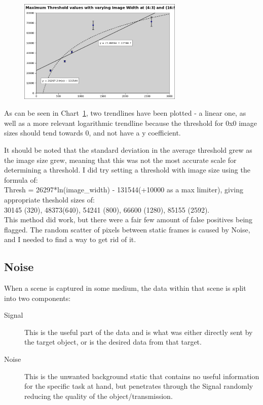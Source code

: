 {{\begin{figure}
	\vspace{-20pt}
	\begin{center}
		\includegraphics[width=0.7\textwidth]{../images/chart-threshold-with-varying-image}
	\end{center}
	\vspace{-15pt}
	\caption{}
	\label{chart:thresholds}
	\vspace{-10pt}
\end{figure}

As can be seen in Chart~\cref{chart:thresholds}, two trendlines have been plotted - a linear one, as well as a more relevant logarithmic trendline because the threshold for 0x0 image sizes should tend towards 0, and not have a y coefficient.

It should be noted that the standard deviation in the average threshold grew as the image size grew, meaning that this was not the most accurate scale for determining a threshold. I did try setting a threshold with image size using the formula of:\\
Thresh = 26297*ln(image\_width) - 131544(+10000 as a max limiter),  giving appropriate theshold sizes of:\\
30145 (320), 48373(640), 54241 (800), 66600 (1280), 85155 (2592).\\
This method did work, but there were a fair few amount of false positives being flagged.
The random scatter of pixels between static frames is caused by Noise, and I needed to find a way to get rid of it.

\subsection{Noise}

When a scene is captured in some medium, the data within that scene is split into two components:
\begin{description}
\item [Signal] This is the useful part of the data and is what was either directly sent by the target object, or is the desired data from that target.
\item [Noise] This is the unwanted background static that contains no useful information for the specific task at hand, but penetrates through the Signal randomly reducing the quality of the object/transmission.
\end{description}

}}
